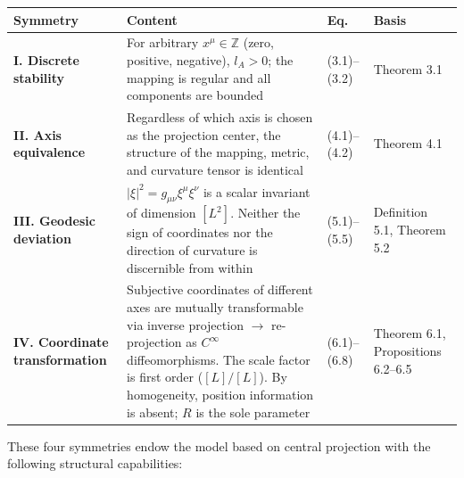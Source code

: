 \documentclass[a4paper,11pt]{article}
\theoremstyle{definition}
\begin{document}
{\def\LTcaptype{table} %
\begin{longtable}[]{@{}
  >{\raggedright\arraybackslash}p{}
  >{\raggedright\arraybackslash}p{}
  >{\raggedright\arraybackslash}p{}
  >{\raggedright\arraybackslash}p{}@{}}
\toprule\noalign{}
\begin{minipage}[b]{\linewidth}\raggedright
Symmetry
\end{minipage} & \begin{minipage}[b]{\linewidth}\raggedright
Content
\end{minipage} & \begin{minipage}[b]{\linewidth}\raggedright
Eq.
\end{minipage} & \begin{minipage}[b]{\linewidth}\raggedright
Basis
\end{minipage} \\
\midrule\noalign{}
\endhead
\bottomrule\noalign{}
\endlastfoot
\textbf{I. Discrete stability} & For arbitrary \(x^\mu \in \mathbb{Z}\) (zero, positive, negative), \(l_A > 0\); the mapping is regular and all components are bounded & (3.1)--(3.2) & Theorem 3.1 \\
\textbf{II. Axis equivalence} & Regardless of which axis is chosen as the projection center, the structure of the mapping, metric, and curvature tensor is identical & (4.1)--(4.2) & Theorem 4.1 \\
\textbf{III. Geodesic deviation} & \(\lvert\xi\rvert^2 = g_{\mu\nu}\xi^\mu\xi^\nu\) is a scalar invariant of dimension \([L^2]\). Neither the sign of coordinates nor the direction of curvature is discernible from within & (5.1)--(5.5) & Definition 5.1, Theorem 5.2 \\
\textbf{IV. Coordinate transformation} & Subjective coordinates of different axes are mutually transformable via inverse projection \(\to\) re-projection as \(C^\infty\) diffeomorphisms. The scale factor is first order (\([L]/[L]\)). By homogeneity, position information is absent; \(R\) is the sole parameter & (6.1)--(6.8) & Theorem 6.1, Propositions 6.2--6.5 \\
\end{longtable}
}

These four symmetries endow the model based on central projection with the following structural capabilities:
\end{document}
